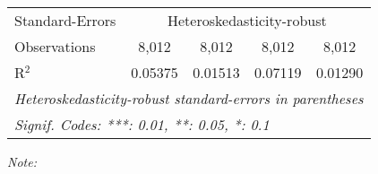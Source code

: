\begin{table}[htbp!]
\begin{adjustbox}{width = 1\textwidth, max height = 0.95\textheight, center}
\begin{threeparttable}[b]
\begin{tabular}{lcccc}
            \midrule 
            Standard-Errors & \multicolumn{4}{c}{Heteroskedasticity-robust} \\ 
            Observations         & 8,012                         & 8,012                         & 8,012                          & 8,012\\  
            R$^2$                & 0.05375                       & 0.01513                       & 0.07119                        & 0.01290\\  
            \midrule \midrule
            \multicolumn{5}{l}{\emph{Heteroskedasticity-robust standard-errors in parentheses}}\\
            \multicolumn{5}{l}{\emph{Signif. Codes: ***: 0.01, **: 0.05, *: 0.1}}\\
         \end{tabular}
         
         \begin{tablenotes}\item \medskip \textit{Note:}
         \end{tablenotes}
      \end{threeparttable}
   \end{adjustbox}
\end{table}


